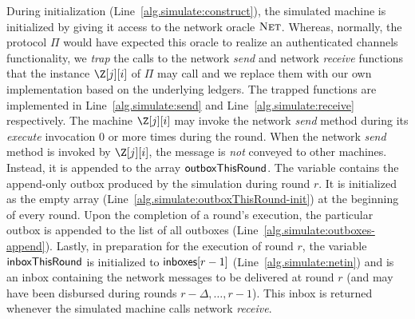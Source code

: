 During initialization (Line~\ref{alg.simulate:construct}),
the simulated machine is
initialized by giving it access to the network oracle $\textsc{Net}$.
Whereas, normally, the protocol $\Pi$ would have expected this
oracle to realize an authenticated channels functionality, we
\emph{trap} the calls to the network \emph{send} and network
\emph{receive} functions that the instance $\Z[j][i]$ of $\Pi$
may call and we replace them with our own implementation based on
the underlying ledgers. The trapped functions are implemented
in Line~\ref{alg.simulate:send} and Line~\ref{alg.simulate:receive}
respectively. The machine $\Z[j][i]$ may invoke the network
\emph{send} method during its \emph{execute} invocation $0$
or more times during the round. When the network \emph{send} method
is invoked by $\Z[j][i]$, the message is \emph{not} conveyed
to other machines. Instead, it is appended to the array
$\textsf{outboxThisRound}$. The variable contains the append-only
outbox produced by the simulation during round $r$. It is
initialized as the empty array
(Line~\ref{alg.simulate:outboxThisRound-init}) at the beginning
of every round. Upon the completion of a round's execution,
the particular outbox is appended to the list of all outboxes
(Line~\ref{alg.simulate:outboxes-append}).
Lastly, in preparation for the execution of round $r$,
the variable $\textsf{inboxThisRound}$ is initialized to
$\textsf{inboxes}[r - 1]$ (Line~\ref{alg.simulate:netin})
and is an inbox containing the network messages to be
delivered at round $r$ (and may have been disbursed during
rounds $r - \Delta, \ldots, r - 1$). This inbox is returned
whenever the simulated machine calls network \emph{receive}.


